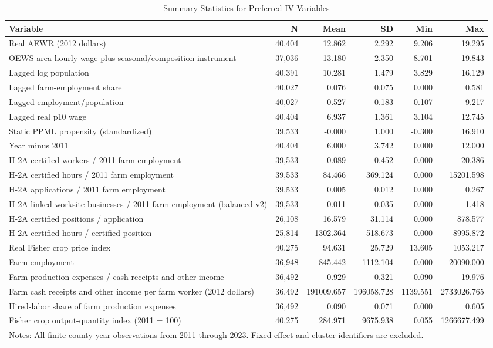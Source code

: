 \begin{table}[htbp]
\centering
\caption{Summary Statistics for Preferred IV Variables}
\label{tab:iv_preferred_sumstats}
\begin{tabular}{lrrrrr}
\hline\hline
Variable & N & Mean & SD & Min & Max \\
\hline
Real AEWR (2012 dollars) & 40,404 & 12.862 & 2.292 & 9.206 & 19.295 \\
OEWS-area hourly-wage plus seasonal/composition instrument & 37,036 & 13.180 & 2.350 & 8.701 & 19.843 \\
Lagged log population & 40,391 & 10.281 & 1.479 & 3.829 & 16.129 \\
Lagged farm-employment share & 40,027 & 0.076 & 0.075 & 0.000 & 0.581 \\
Lagged employment/population & 40,027 & 0.527 & 0.183 & 0.107 & 9.217 \\
Lagged real p10 wage & 40,404 & 6.937 & 1.361 & 3.104 & 12.745 \\
Static PPML propensity (standardized) & 39,533 & -0.000 & 1.000 & -0.300 & 16.910 \\
Year minus 2011 & 40,404 & 6.000 & 3.742 & 0.000 & 12.000 \\
H-2A certified workers / 2011 farm employment & 39,533 & 0.089 & 0.452 & 0.000 & 20.386 \\
H-2A certified hours / 2011 farm employment & 39,533 & 84.466 & 369.124 & 0.000 & 15201.598 \\
H-2A applications / 2011 farm employment & 39,533 & 0.005 & 0.012 & 0.000 & 0.267 \\
H-2A linked worksite businesses / 2011 farm employment (balanced v2) & 39,533 & 0.011 & 0.035 & 0.000 & 1.418 \\
H-2A certified positions / application & 26,108 & 16.579 & 31.114 & 0.000 & 878.577 \\
H-2A certified hours / certified position & 25,814 & 1302.364 & 518.673 & 0.000 & 8995.872 \\
Real Fisher crop price index & 40,275 & 94.631 & 25.729 & 13.605 & 1053.217 \\
Farm employment & 36,948 & 845.442 & 1112.104 & 0.000 & 20090.000 \\
Farm production expenses / cash receipts and other income & 36,492 & 0.929 & 0.321 & 0.090 & 19.976 \\
Farm cash receipts and other income per farm worker (2012 dollars) & 36,492 & 191009.657 & 196058.728 & 1139.551 & 2733026.765 \\
Hired-labor share of farm production expenses & 36,492 & 0.090 & 0.071 & 0.000 & 0.605 \\
Fisher crop output-quantity index (2011 = 100) & 40,275 & 284.971 & 9675.938 & 0.055 & 1266677.499 \\
\hline\hline
\multicolumn{6}{p{0.95\linewidth}}{\footnotesize Notes: All finite county-year observations from 2011 through 2023. Fixed-effect and cluster identifiers are excluded.} \\
\end{tabular}
\end{table}
